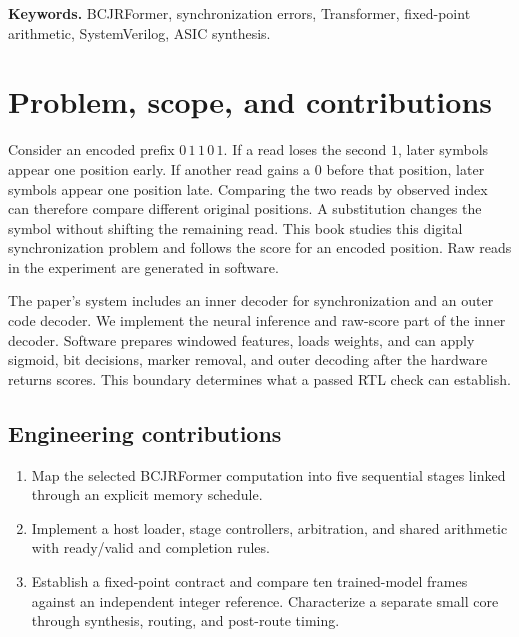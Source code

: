 
{\small\textbf{Keywords.} BCJRFormer, synchronization errors, Transformer, fixed-point arithmetic, SystemVerilog, ASIC synthesis.}

\clearpage
\section{Problem, scope, and contributions}

Consider an encoded prefix \(0\,1\,1\,0\,1\). If a read loses the second \(1\), later symbols appear one position early. If another read gains a \(0\) before that position, later symbols appear one position late. Comparing the two reads by observed index can therefore compare different original positions. A substitution changes the symbol without shifting the remaining read. This book studies this digital synchronization problem and follows the score for an encoded position. Raw reads in the experiment are generated in software.

The paper's system includes an inner decoder for synchronization and an outer code decoder. We implement the neural inference and raw-score part of the inner decoder. Software prepares windowed features, loads weights, and can apply sigmoid, bit decisions, marker removal, and outer decoding after the hardware returns scores. This boundary determines what a passed RTL check can establish.

\subsection*{Engineering contributions}
\begin{enumerate}
\setlength{\itemsep}{3pt}
\item Map the selected BCJRFormer computation into five sequential stages linked through an explicit memory schedule.
\item Implement a host loader, stage controllers, arbitration, and shared arithmetic with ready/valid and completion rules.
\item Establish a fixed-point contract and compare ten trained-model frames against an independent integer reference. Characterize a separate small core through synthesis, routing, and post-route timing.
\end{enumerate}

